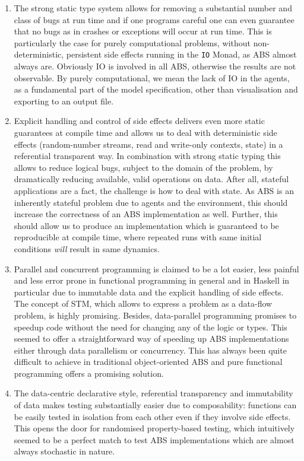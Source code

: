 \begin{enumerate}
	\item The strong static type system allows for removing a substantial number and class of bugs at run time and if one programs careful one can even guarantee that no bugs as in crashes or exceptions will occur at run time. This is particularly the case for purely computational problems, without non-deterministic, persistent side effects running in the \texttt{IO} Monad, as ABS almost always are. Obviously IO is involved in all ABS, otherwise the results are not observable. By purely computational, we mean the lack of IO in the agents, as a fundamental part of the model specification, other than visualisation and exporting to an output file.
	
	\item Explicit handling and control of side effects delivers even more static guarantees at compile time and allows us to deal with deterministic side effects (random-number streams, read and write-only contexts, state) in a referential transparent way. In combination with strong static typing this allows to reduce logical bugs, subject to the domain of the problem, by dramatically reducing available, valid operations on data. After all, stateful applications are a fact, the challenge is how to deal with state. As ABS is an inherently stateful problem due to agents and the environment, this should increase the correctness of an ABS implementation as well. Further, this should allow us to produce an implementation which is guaranteed to be reproducible at compile time, where repeated runs with same initial conditions \textit{will} result in same dynamics.
	
	\item Parallel and concurrent programming is claimed to be a lot easier, less painful and less error prone in functional programming in general and in Haskell in particular due to immutable data and the explicit handling of side effects. The concept of STM, which allows to express a problem as a data-flow problem, is highly promising. Besides, data-parallel programming promises to speedup code without the need for changing any of the logic or types. This seemed to offer a straightforward way of speeding up ABS implementations either through data parallelism or concurrency. This has always been quite difficult to achieve in traditional object-oriented ABS and pure functional programming offers a promising solution.
	
	\item The data-centric declarative style, referential transparency and immutability of data makes testing substantially easier due to composability: functions can be easily tested in isolation from each other even if they involve side effects. This opens the door for randomised property-based testing, which intuitively seemed to be a perfect match to test ABS implementations which are almost always stochastic in nature.
\end{enumerate}

